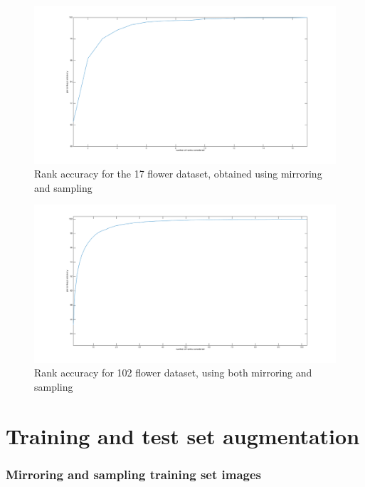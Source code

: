 \documentclass[11pt, a4paper]{report}
\begin{document}
\begin{figure}[hbt]
	\centering
  \includegraphics[totalheight=8cm]{img/19.png}
  \caption{Rank accuracy for the 17 flower dataset, obtained using mirroring and sampling}
  \label{img:19}
\end{figure}

\begin{figure}[hbt]
	\centering
  \includegraphics[totalheight=8cm]{img/21.png}
  \caption{Rank accuracy for 102 flower dataset, using both mirroring and sampling}
  \label{img:21}
\end{figure}



\section{Training and test set augmentation}

\subsubsection{Mirroring and sampling training set images}
\end{document}

